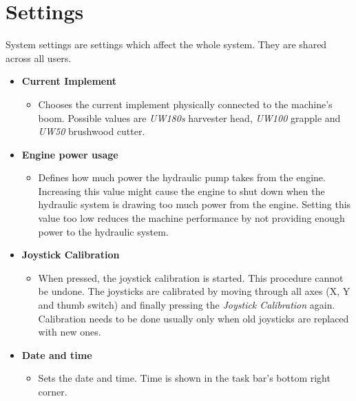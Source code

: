 \documentclass[12pt,a4paper,english]{uvmanual}
\begin{document}
\section{Settings}\label{ch:system_settings}

System settings are settings which affect the whole system. They are shared across all users.



\begin{itemize}
 \item \textbf{Current Implement}
 \begin{itemize}
  \item Chooses the current implement physically connected to the machine's boom. Possible values are \textit{UW180s} harvester head, \textit{UW100} grapple and \textit{UW50} brushwood cutter.
 \end{itemize}

 \item \textbf{Engine power usage}
 \begin{itemize}
  \item Defines how much power the hydraulic pump takes from the engine. Increasing this value might cause the engine to shut down when the hydraulic system is drawing too much power from the engine. Setting this value too low reduces the machine performance by not providing enough power to the hydraulic system.
 \end{itemize}

 \item \textbf{Joystick Calibration}
 \begin{itemize}
  \item When pressed, the joystick calibration is started. This procedure cannot be undone. The joysticks are calibrated by moving through all axes (X, Y and thumb switch) and finally pressing the \textit{Joystick Calibration} again. Calibration needs to be done usually only when old joysticks are replaced with new ones.
 \end{itemize}

 \item \textbf{Date and time}
 \begin{itemize}
  \item Sets the date and time. Time is shown in the task bar's bottom right corner.
 \end{itemize}

\end{itemize}
\end{document}
